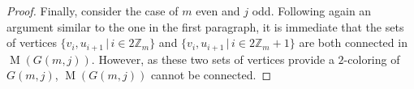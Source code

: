 \documentclass[12pt]{amsart}
\theoremstyle{definition}
\theoremstyle{remark}
\numberwithin{equation}{section}
\numberwithin{figure}{section}
\newcommand{\M}{\operatorname{M}}
\newcommand{\Z}{\mathbb{Z}}
\begin{document}
\begin{proof}
    Finally, consider the case of $m$ even and $j$ odd. Following again an argument similar to the one in the first paragraph, it is immediate that the sets of vertices $\{v_i, u_{i+1} \,|\, i\in 2\Z_m\}$ and $\{v_i, u_{i+1} \,|\, i\in 2\Z_m+1\}$ are both connected in $\M(G(m,j))$. However, as these two sets of vertices provide a $2$-coloring of $G(m,j)$, $\M(G(m,j))$ cannot be connected.
\end{proof}
\end{document}
